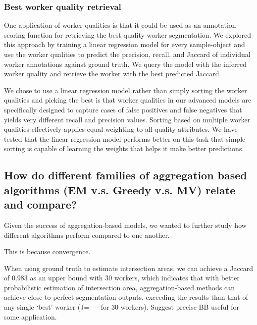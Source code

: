     \subsubsection{Best worker quality retrieval}
    One application of worker qualities is that it could be used as an annotation scoring function for retrieving the best quality worker segmentation. We explored this approach by training a linear regression model for every sample-object and use the worker qualities to predict the precision, recall, and Jaccard of individual worker annotations against ground truth. We query the model with the inferred worker quality and retrieve the worker with the best predicted Jaccard. 
    \par We chose to use a linear regression model rather than simply sorting the worker qualities and picking the best is that worker qualities in our advanced models are specifically designed to capture cases of false positives and false negatives that yields very different recall and precision values. Sorting based on multiple worker qualities effectively applies equal weighting to all quality attributes. We have tested that the linear regression model performs better on this task that simple sorting is capable of learning the weights that helps it make better predictions.
    \par 
  \subsection{How do different families of aggregation based algorithms (EM v.s. Greedy v.s. MV) relate and compare?}
    Given the success of aggregation-based models, we wanted to further study how different algorithms perform compared to one another.

    
     This is because convergence.



    When using ground truth to estimate intersection areas, we can achieve a Jaccard of 0.983 as an upper bound with 30 workers, which indicates that with better probabilistic estimation of intersection area, aggregation-based methods can achieve close to perfect segmentation outputs, exceeding the results than that of any single `best' worker (J= --- for 30 workers). Suggest precise BB useful for some application.
